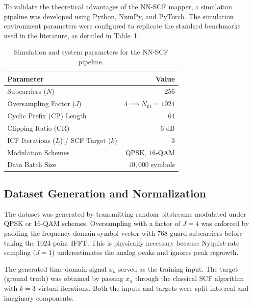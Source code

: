 To validate the theoretical advantages of the NN-SCF mapper, a simulation pipeline was developed using Python, NumPy, and PyTorch. The simulation environment parameters were configured to replicate the standard benchmarks used in the literature, as detailed in Table~\ref{tab:scf_parameters}.

\begin{table}[H]
    \centering
    \caption{Simulation and system parameters for the NN-SCF pipeline.}
    \label{tab:scf_parameters}
    \begin{tabular}{l r}
        \toprule
        \textbf{Parameter}                      & \textbf{Value}                       \\
        \midrule
        Subcarriers ($N$)                       & $256$                                \\
        Oversampling Factor ($J$)               & $4 \implies N_{\mathrm{fft}} = 1024$ \\
        Cyclic Prefix (CP) Length               & $64$                                 \\
        Clipping Ratio (CR)                     & $6$ dB                               \\
        ICF Iterations ($L$) / SCF Target ($k$) & $3$                                  \\
        Modulation Schemes                      & QPSK, $16$-QAM                       \\
        Data Batch Size                         & $10{,}000$ symbols                   \\
        \bottomrule
    \end{tabular}
\end{table}

\subsection{Dataset Generation and Normalization}

The dataset was generated by transmitting random bitstreams modulated under QPSK or 16-QAM schemes. Oversampling with a factor of $J = 4$ was enforced by padding the frequency-domain symbol vector with $768$ guard subcarriers before taking the $1024$-point IFFT. This is physically necessary because Nyquist-rate sampling ($J=1$) underestimates the analog peaks and ignores peak regrowth.

The generated time-domain signal $x_n$ served as the training input. The target (ground truth) was obtained by passing $x_n$ through the classical SCF algorithm with $k=3$ virtual iterations. Both the inputs and targets were split into real and imaginary components.

